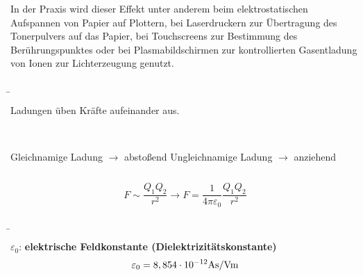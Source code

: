 \begin{frame}
{			In der Praxis wird dieser Effekt unter anderem beim elektrostatischen Aufspannen von Papier auf Plottern, 
			bei Laserdruckern zur Übertragung des Tonerpulvers auf das Papier, bei Touchscreens zur
			Bestimmung des Berührungspunktes oder bei Plasmabildschirmen zur kontrollierten 
			Gasentladung von Ionen zur Lichterzeugung genutzt.

		
		}


		\b{
		\hspace{-9pt}Ladungen üben Kräfte aufeinander aus.\\
		\phantom{text}\\
		\begin{columns}
			Gleichnamige Ladung $\rightarrow$ abstoßend 
			Ungleichnamige Ladung $\rightarrow$ anziehend
		\end{columns}
 
		\begin{figure}[h!]
			\centering
			\label{fig:coulomb}
		\end{figure}

		\pause
		\pause
		
	



		\begin{equation*}
			F \sim \frac{Q_1 Q_2}{r^2} \rightarrow F = \frac{1}{4 \pi \varepsilon_0} \frac{Q_1 Q_2}{r^2} 
		\end{equation*}

		}

		\pause
		\b{

		$\varepsilon_0$: \textbf{elektrische Feldkonstante (Dielektrizitätskonstante)} 
		\begin{equation*}
			\varepsilon_0 = 8,854 \cdot 10^{-12} \rm{As/Vm}
		\end{equation*}  

		}


\end{frame}
